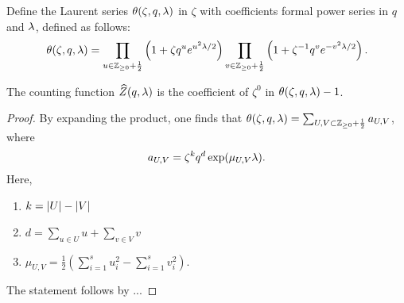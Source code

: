 \begin{defi}
 Define the Laurent series $\theta(\zeta,q,\lambda)$ in $\zeta$ with coefficients formal power series in $q$ and $\lambda$, defined as follows:
 \[
  \theta(\zeta,q,\lambda) = \prod_{u\in\mathbb{Z}_{\geq 0}+\frac{1}{2}} \left(1+\zeta q^u e^{u^2\lambda/2}\right) \prod_{v\in\mathbb{Z}_{\geq 0}+\frac{1}{2}} \left(1+\zeta^{-1} q^v e^{-v^2\lambda/2}\right).
 \]
\end{defi}

\begin{lemma}
 The counting function $\widehat{Z}(q,\lambda)$ is the coefficient of $\zeta^0$ in $\theta(\zeta,q,\lambda)-1$.
\end{lemma}
\begin{proof}
 By expanding the product, one finds that $\theta(\zeta,q,\lambda)=\sum_{U,V\subset\mathbb{Z}_{\geq 0}+\frac{1}{2}}a_{U,V}$, where \[a_{U,V}=\zeta^k q^d \exp(\mu_{U,V}\lambda).\] Here, \begin{enumerate} \item $k=|U|-|V|$
 \item $d=\sum_{u\in U}u + \sum_{v\in V}v$
 \item $\mu_{U,V}=\frac{1}{2}\left(\sum_{i=1}^s u_i^2 - \sum_{i=1}^s v_i^2\right)$.
 \end{enumerate}
The statement follows by ...
\end{proof}


